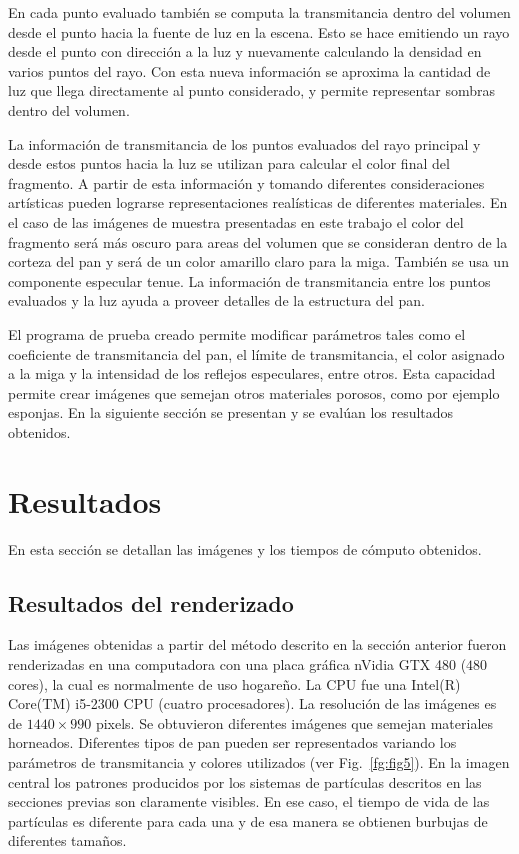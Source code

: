 \documentclass[oneside,a4paper,spanish,links]{amca}
\begin{document}
En cada punto evaluado también se computa la transmitancia dentro del
volumen desde el punto hacia la fuente de luz en la escena. Esto se
hace emitiendo un rayo desde el punto con dirección a la luz
y nuevamente calculando la densidad en varios puntos del rayo. Con esta
nueva información se aproxima la cantidad de luz que llega
directamente al punto considerado, y permite representar sombras dentro
del volumen.

La información de transmitancia de los puntos evaluados del rayo
principal y desde estos puntos hacia la luz se
utilizan para calcular el color final del fragmento. A partir de
esta información y tomando diferentes consideraciones artísticas
pueden lograrse representaciones realísticas de diferentes
materiales. En el caso de las imágenes de muestra presentadas en este
trabajo el color del fragmento será más oscuro para areas del volumen
que se consideran dentro de la corteza del pan y será de un color
amarillo claro para la miga. También se usa un componente especular
tenue. La información de transmitancia entre los puntos evaluados y la
luz ayuda a proveer detalles de la estructura del pan.

El programa de prueba creado permite modificar parámetros tales como
el coeficiente de transmitancia del pan, el límite de transmitancia,
el color asignado a la miga y la intensidad de los reflejos especulares,
entre otros. Esta capacidad permite crear imágenes que semejan otros
materiales porosos, como por ejemplo esponjas. En la siguiente sección
se presentan y se evalúan los resultados obtenidos.

\section{Resultados}

En esta sección se detallan las imágenes y los tiempos de
cómputo obtenidos. 

\subsection{Resultados del renderizado}

Las imágenes obtenidas a partir del método descrito en la
sección anterior fueron renderizadas en una computadora con una placa
gráfica nVidia GTX 480 ($480$ cores), la cual es normalmente de uso
hogareño. La CPU fue una Intel(R) Core(TM) i5-2300 CPU (cuatro
procesadores). La resolución de las imágenes es de $1440\times990$
pixels. 
Se obtuvieron diferentes imágenes que semejan materiales
horneados. Diferentes tipos de pan pueden ser representados variando los parámetros de transmitancia y colores utilizados (ver
Fig.~\ref{fg:fig5}). En la imagen central los patrones producidos
por los sistemas de partículas descritos en las secciones previas son
claramente visibles. En ese caso, el tiempo de vida de las partículas
es diferente para cada una y de esa manera se obtienen burbujas de
diferentes tamaños.
\end{document}
